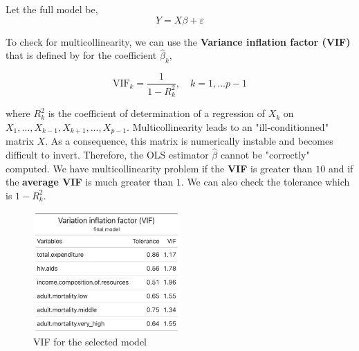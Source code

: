 Let the full model be, 
\begin{equation}
	Y = X\beta + \varepsilon
\end{equation}

To check for multicollinearity, we can use the \textbf{Variance inflation factor (VIF)} that is defined by for the coefficient $\hat{\beta}_k$,

\begin{equation}
	\text{VIF}_k = \frac{1}{1 - R^2_k}, \quad k = 1,...p-1
\end{equation}

where $R^2_k$ is the coefficient of determination of a regression of $X_k$ on $X_1,\dots,X_{k-1},X_{k+1},\dots,X_{p-1}$. Multicollinearity leads to an "ill-conditionned" matrix $X$. As a consequence, this matrix is numerically instable and becomes difficult to invert. Therefore, the OLS estimator $\hat{\beta}$ cannot be "correctly" computed.
We have multicollinearity problem if the \textbf{VIF} is greater than $10$ and if the \textbf{average VIF} is much greater than $1$. We can also check the tolerance which is $1 - R^2_k$.



\begin{figure}[H]
	\centering
	\includegraphics[width=0.5\textwidth]{figures/models/vif_final_model.png}
	\caption{VIF for the selected model}
	\label{fig:vif_final_model}
\end{figure}

